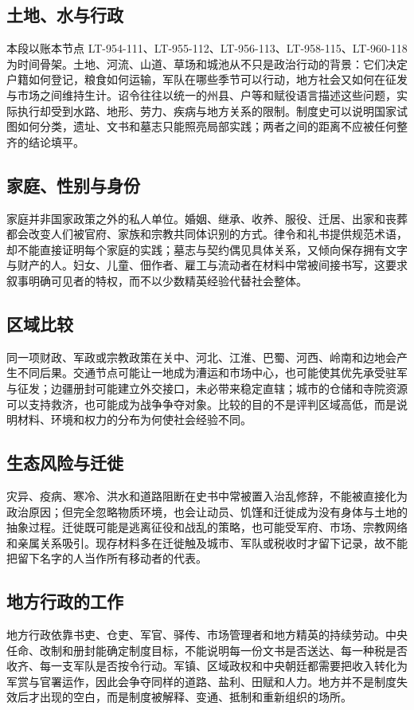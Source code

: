 \subsection{土地、水与行政}
本段以账本节点 LT-954-111、LT-955-112、LT-956-113、LT-958-115、LT-960-118 为时间骨架。土地、河流、山道、草场和城池从不只是政治行动的背景：它们决定户籍如何登记，粮食如何运输，军队在哪些季节可以行动，地方社会又如何在征发与市场之间维持生计。诏令往往以统一的州县、户等和赋役语言描述这些问题，实际执行却受到水路、地形、劳力、疾病与地方关系的限制。制度史可以说明国家试图如何分类，遗址、文书和墓志只能照亮局部实践；两者之间的距离不应被任何整齐的结论填平。

\subsection{家庭、性别与身份}
家庭并非国家政策之外的私人单位。婚姻、继承、收养、服役、迁居、出家和丧葬都会改变人们被官府、家族和宗教共同体识别的方式。律令和礼书提供规范术语，却不能直接证明每个家庭的实践；墓志与契约偶见具体关系，又倾向保存拥有文字与财产的人。妇女、儿童、佃作者、雇工与流动者在材料中常被间接书写，这要求叙事明确可见者的特权，而不以少数精英经验代替社会整体。

\subsection{区域比较}
同一项财政、军政或宗教政策在关中、河北、江淮、巴蜀、河西、岭南和边地会产生不同后果。交通节点可能让一地成为漕运和市场中心，也可能使其优先承受驻军与征发；边疆册封可能建立外交接口，未必带来稳定直辖；城市的仓储和寺院资源可以支持救济，也可能成为战争争夺对象。比较的目的不是评判区域高低，而是说明材料、环境和权力的分布为何使社会经验不同。

\subsection{生态风险与迁徙}
灾异、疫病、寒冷、洪水和道路阻断在史书中常被置入治乱修辞，不能被直接化为政治原因；但完全忽略物质环境，也会让动员、饥馑和迁徙成为没有身体与土地的抽象过程。迁徙既可能是逃离征役和战乱的策略，也可能受军府、市场、宗教网络和亲属关系吸引。现存材料多在迁徙触及城市、军队或税收时才留下记录，故不能把留下名字的人当作所有移动者的代表。

\subsection{地方行政的工作}
地方行政依靠书吏、仓吏、军官、驿传、市场管理者和地方精英的持续劳动。中央任命、改制和册封能确定制度目标，不能说明每一份文书是否送达、每一种税是否收齐、每一支军队是否按令行动。军镇、区域政权和中央朝廷都需要把收入转化为军赏与官署运作，因此会争夺同样的道路、盐利、田赋和人力。地方并不是制度失效后才出现的空白，而是制度被解释、变通、抵制和重新组织的场所。

